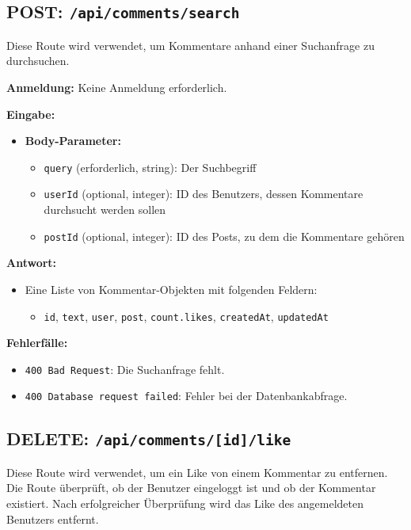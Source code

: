\documentclass[a4paper,12pt]{article}
\begin{document}
\newpage
\subsection{POST: \texttt{/api/comments/search}}

Diese Route wird verwendet, um Kommentare anhand einer Suchanfrage zu
durchsuchen.

\textbf{Anmeldung:} Keine Anmeldung erforderlich.

\textbf{Eingabe:}
\begin{itemize}
    \item \textbf{Body-Parameter:}
    \begin{itemize}
        \item \texttt{query} (erforderlich, string):
            Der Suchbegriff
        \item \texttt{userId} (optional, integer):
            ID des Benutzers, dessen Kommentare durchsucht werden sollen
        \item \texttt{postId} (optional, integer):
            ID des Posts, zu dem die Kommentare gehören
    \end{itemize}
\end{itemize}

\textbf{Antwort:}
\begin{itemize}
    \item Eine Liste von Kommentar-Objekten mit folgenden Feldern:
    \begin{itemize}
        \item \texttt{id},
              \texttt{text},
              \texttt{user},
              \texttt{post},
              \texttt{count.likes},
              \texttt{createdAt},
              \texttt{updatedAt}
    \end{itemize}
\end{itemize}

\textbf{Fehlerfälle:}
\begin{itemize}
    \item \texttt{400 Bad Request}:
        Die Suchanfrage fehlt.
    \item \texttt{400 Database request failed}:
        Fehler bei der Datenbankabfrage.
\end{itemize}

\newpage
\subsection{DELETE: \texttt{/api/comments/[id]/like}}

Diese Route wird verwendet, um ein Like von einem Kommentar zu entfernen. Die
Route überprüft, ob der Benutzer eingeloggt ist und ob der Kommentar existiert.
Nach erfolgreicher Überprüfung wird das Like des angemeldeten Benutzers
entfernt.
\end{document}
